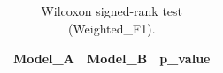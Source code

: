 \begin{table}[t]
\centering
\begin{tabular}{lll}
\toprule
Model_A & Model_B & p_value \\
\midrule
\bottomrule
\end{tabular}
\caption{Wilcoxon signed-rank test (Weighted_F1).}
\label{tab:wilcoxon_Weighted_F1}
\end{table}